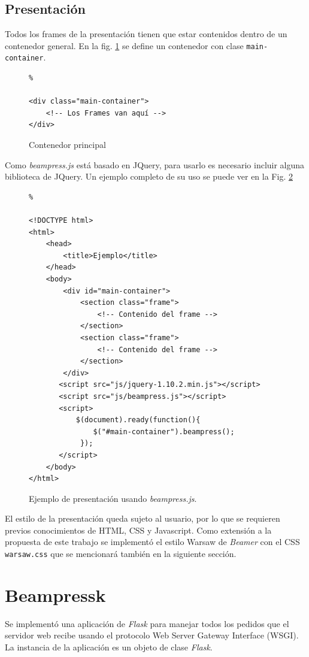 		\subsection{Presentación} %
		\label{sub:presentacion}
			Todos los frames de la presentación tienen que estar contenidos dentro de un contenedor general. En la fig. \ref{fig:main_container} se define un contenedor con clase \texttt{main-container}.
		
			\begin{figure}[htb]%
				\begin{lstlisting}%

<div class="main-container">
	<!-- Los Frames van aquí -->
</div>
				\end{lstlisting}
			\caption{Contenedor principal}
			\label{fig:main_container}
			\end{figure}				


			Como \textit{beampress.js} está basado en JQuery, para usarlo es necesario incluir alguna biblioteca de JQuery. Un ejemplo completo de su uso se puede ver en la Fig. \ref{fig:ex5}

			\begin{figure}[htb]%
				\begin{lstlisting}%

<!DOCTYPE html>
<html>
	<head>
    	<title>Ejemplo</title>
	</head>
	<body>
		<div id="main-container">
			<section class="frame">
				<!-- Contenido del frame -->
			</section>
			<section class="frame">
				<!-- Contenido del frame -->
			</section>						
		</div>
	   <script src="js/jquery-1.10.2.min.js"></script>
	   <script src="js/beampress.js"></script>
	   <script>
	       $(document).ready(function(){     
	           $("#main-container").beampress();
	        });
	   </script>		
	</body>
</html>			
				\end{lstlisting}
			\caption{
				Ejemplo de presentación usando \textit{beampress.js}. 
				\label{fig:ex5} }
			\end{figure}	

			El estilo de la presentación queda sujeto al usuario, por lo que se requieren previos conocimientos de HTML, CSS y Javascript. Como extensión a la propuesta de este trabajo se implementó el estilo Warsaw de \textit{Beamer} con el CSS \texttt{warsaw.css} que se mencionará también en la siguiente sección.

	\section{Beampressk} %
	\label{sec:beampressk_imp}
		Se implementó una aplicación de \textit{Flask} para manejar todos los pedidos que el servidor web recibe usando el protocolo Web Server Gateway Interface (WSGI). La instancia de la aplicación es un objeto de clase \textit{Flask}.

